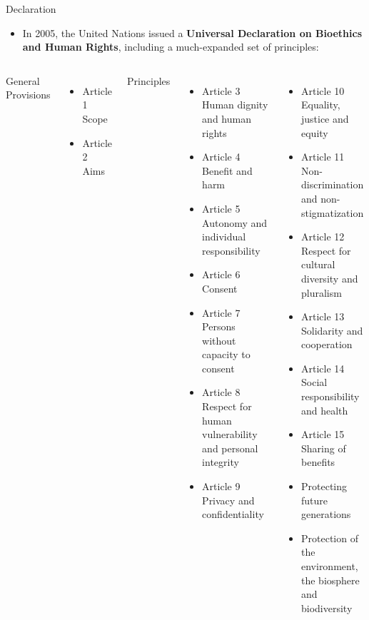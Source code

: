 \documentclass[ignorenonframetext,aspectratio=169]{beamer}
\providecommand{\tightlist}{%
  \setlength{\itemsep}{0pt}\setlength{\parskip}{0pt}}
\begin{document}
\begin{frame}{Declaration}
\protect\hypertarget{declaration}{}

\begin{itemize}
\tightlist
\item
  In 2005, the United Nations issued a \textbf{Universal Declaration on
  Bioethics and Human Rights}, including a much-expanded set of
  principles:
\end{itemize}

\begin{columns}[T,onlytextwidth]
  
  \alert {General Provisions}
  \tiny{
  \begin{itemize}
  \item Article 1 Scope
  \item Article 2 Aims
  \end{itemize}
  }
  
  \alert {Principles}
  \tiny{
  \begin{itemize}
  \item Article 3 Human dignity and human rights
  \item Article 4 Benefit and harm
  \item Article 5 Autonomy and individual responsibility
  \item Article 6 Consent
  \item Article 7 Persons without capacity to consent
  \item Article 8 Respect for human vulnerability and personal integrity
  \item Article 9 Privacy and confidentiality
  \end{itemize}
  }
  
  
  \tiny{
  \begin{itemize}
  \item Article 10 Equality, justice and equity
  \item Article 11 Non-discrimination and non-stigmatization
  \item Article 12 Respect for cultural diversity and pluralism
  \item Article 13 Solidarity and cooperation
  \item Article 14 Social responsibility and health
  \item Article 15 Sharing of benefits
  \item Protecting future generations
  \item Protection of the environment, the biosphere and biodiversity
  \end{itemize}
  }

\end{columns}

\end{frame}
\end{document}
